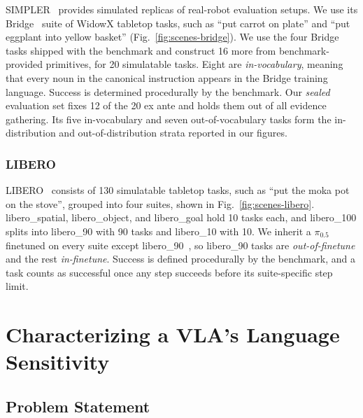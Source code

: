 \documentclass[letterpaper, 10 pt, conference]{ieeeconf} %
\begin{document}
SIMPLER~\cite{simpler} provides simulated replicas of real-robot evaluation setups. We use its Bridge~\cite{bridge} suite of WidowX tabletop tasks, such as ``put carrot on plate'' and ``put eggplant into yellow basket'' (Fig.~\ref{fig:scenes-bridge}). We use the four Bridge tasks shipped with the benchmark and construct 16 more from benchmark-provided primitives, for 20 simulatable tasks. Eight are \emph{in-vocabulary}, meaning that every noun in the canonical instruction appears in the Bridge training language. Success is determined procedurally by the benchmark. Our \emph{sealed} evaluation set fixes 12 of the 20 ex ante and holds them out of all evidence gathering. Its five in-vocabulary and seven out-of-vocabulary tasks form the in-distribution and out-of-distribution strata reported in our figures.

\subsubsection{LIBERO}

LIBERO~\cite{liu2023libero} consists of 130 simulatable tabletop tasks, such as ``put the moka pot on the stove'', grouped into four suites, shown in Fig.~\ref{fig:scenes-libero}. libero\_spatial, libero\_object, and libero\_goal hold 10 tasks each, and libero\_100 splits into libero\_90 with 90 tasks and libero\_10 with 10. We inherit a $\pi_{0.5}$ finetuned on every suite except libero\_90~\cite{pi05}, so libero\_90 tasks are \emph{out-of-finetune} and the rest \emph{in-finetune}. Success is defined procedurally by the benchmark, and a task counts as successful once any step succeeds before its suite-specific step limit.



\section{Characterizing a VLA's Language Sensitivity}
\label{sec:minimal-pairs}

\subsection{Problem Statement}
\label{sec:problem}
\end{document}
